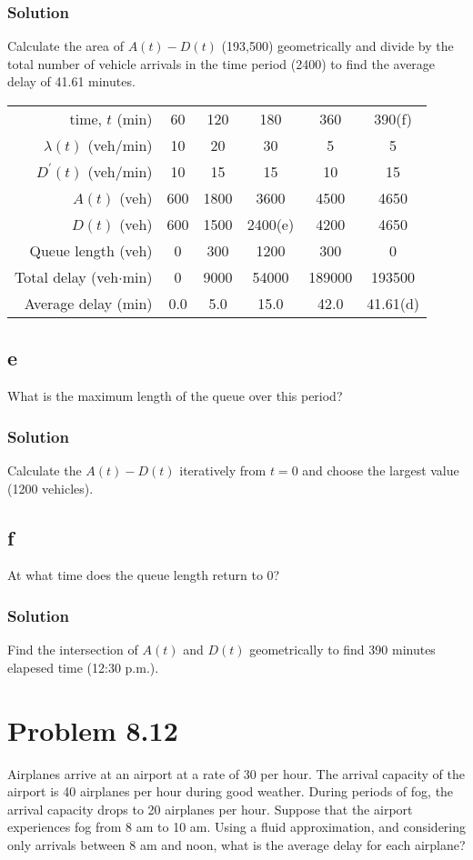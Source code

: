 \documentclass[letterpaper]{amsart}
\begin{document}
\subsubsection*{Solution}
Calculate the area of $A(t) - D(t)$ (193,500) geometrically and divide by the total number
of vehicle arrivals in the time period (2400) to find the average delay of 41.61 minutes.
\begin{center}
\begin{tabular}{rccccc}
  time, $t$ (min) & 60 & 120 & 180 & 360 & 390(f)\\
  $\lambda(t)$ (veh/min)&10& 20& 30& 5& 5\\
  $D^\prime(t)$ (veh/min)&10& 15& 15& 10& 15 \\
  $A(t)$ (veh) &600& 1800 & 3600 & 4500& 4650 \\
  $D(t)$ (veh) &600& 1500 & 2400(e)& 4200& 4650 \\
  Queue length (veh) &0&  300& 1200& 300&    0 \\
  Total delay (veh$\cdot$min)& 0 & 9000 & 54000 & 189000 & 193500\\
  Average delay (min) & 0.0 & 5.0 & 15.0 & 42.0 & 41.61(d)
\end{tabular}
\end{center}
\subsection*{e}
What is the maximum length of the queue over this period?
\subsubsection*{Solution}
Calculate the $A(t)-D(t)$ iteratively from $t=0$ and choose the largest value (1200 vehicles).
\subsection*{f}
At what time does the queue length return to 0?
\subsubsection*{Solution}
Find the intersection of $A(t)$ and $D(t)$ geometrically to find 390 minutes
elapesed time (12:30 p.m.).

\section{Problem 8.12} %
Airplanes arrive at an airport at a rate of 30 per hour. The arrival capacity
of the airport is 40 airplanes per hour during good weather. During periods
of fog, the arrival capacity drops to 20 airplanes per hour. Suppose that the
airport experiences fog from 8 am to 10 am. Using a fluid approximation,
and considering only arrivals between 8 am and noon, what is the average
delay for each airplane?
\end{document}
